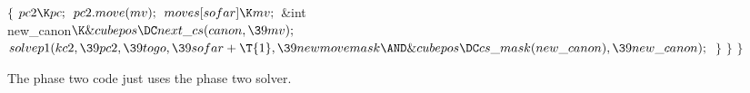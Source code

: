 ${}\{{}$\1\6
${}\\{pc2}\K\\{pc};{}$\6
${}\\{pc2}.\\{move}(\\{mv});{}$\6
${}\\{moves}[\\{sofar}]\K\\{mv};{}$\7
\&{int} \\{new\_canon}${}\K\&{cubepos}\DC\\{next\_cs}(\\{canon},\39\\{mv});{}$\7
${}\\{solvep1}(\\{kc2},\39\\{pc2},\39\\{togo},\39\\{sofar}+\T{1},\39%
\\{newmovemask}\AND\&{cubepos}\DC\\{cs\_mask}(\\{new\_canon}),\39\\{new%
\_canon});{}$\6
\4${}\}{}$\2\6
\4${}\}{}$\2\6
\4${}\}{}$\2\par
\fi

The phase two code just uses the phase two solver.

